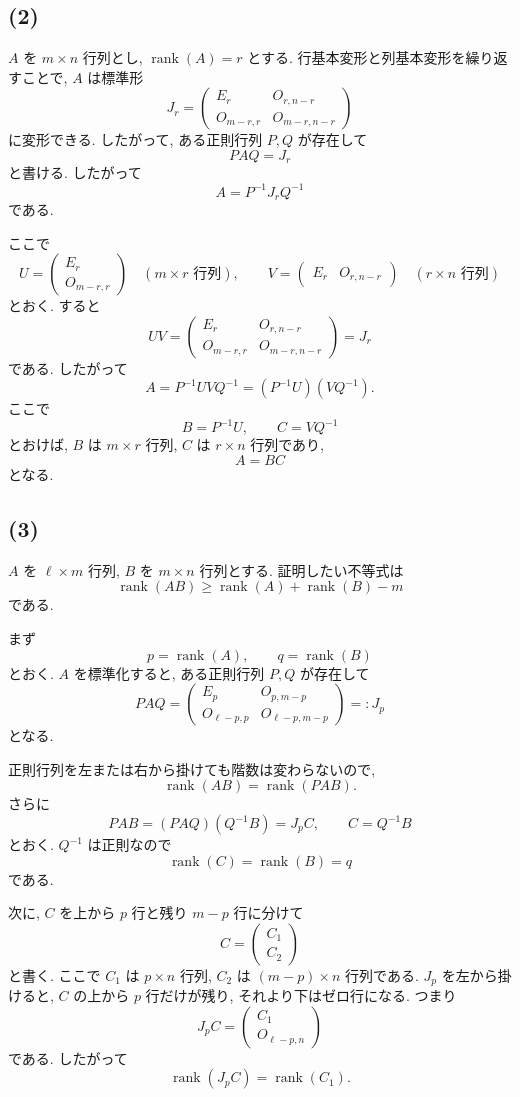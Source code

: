 \documentclass[uplatex,dvipdfmx,a4paper,14pt]{jsarticle}
\newcommand{\rank}{\operatorname{rank}}
\begin{document}
\subsection*{(2)}
$A$ を $m\times n$ 行列とし, $\rank(A)=r$ とする. 行基本変形と列基本変形を繰り返すことで, $A$ は標準形
\[
J_r=
\begin{pmatrix}
E_r&O_{r,n-r}\\
O_{m-r,r}&O_{m-r,n-r}
\end{pmatrix}
\]
に変形できる. したがって, ある正則行列 $P,Q$ が存在して
\[
PAQ=J_r
\]
と書ける. したがって
\[
A=P^{-1}J_rQ^{-1}
\]
である.

ここで
\[
U=
\begin{pmatrix}
E_r\\
O_{m-r,r}
\end{pmatrix}
\quad (m\times r\text{ 行列}),
\qquad
V=
\begin{pmatrix}
E_r&O_{r,n-r}
\end{pmatrix}
\quad (r\times n\text{ 行列})
\]
とおく. すると
\[
UV=
\begin{pmatrix}
E_r&O_{r,n-r}\\
O_{m-r,r}&O_{m-r,n-r}
\end{pmatrix}
=J_r
\]
である. したがって
\[
A=P^{-1}UVQ^{-1}=(P^{-1}U)(VQ^{-1}).
\]
ここで
\[
B=P^{-1}U,
\qquad
C=VQ^{-1}
\]
とおけば, $B$ は $m\times r$ 行列, $C$ は $r\times n$ 行列であり,
\[
\boxed{A=BC}
\]
となる.

\subsection*{(3)}
$A$ を $\ell\times m$ 行列, $B$ を $m\times n$ 行列とする. 証明したい不等式は
\[
\rank(AB)\ge \rank(A)+\rank(B)-m
\]
である.

まず
\[
p=\rank(A),\qquad q=\rank(B)
\]
とおく. $A$ を標準化すると, ある正則行列 $P,Q$ が存在して
\[
PAQ=
\begin{pmatrix}
E_p&O_{p,m-p}\\
O_{\ell-p,p}&O_{\ell-p,m-p}
\end{pmatrix}
=:J_p
\]
となる.

正則行列を左または右から掛けても階数は変わらないので,
\[
\rank(AB)=\rank(PAB).
\]
さらに
\[
PAB=(PAQ)(Q^{-1}B)=J_pC,
\qquad C=Q^{-1}B
\]
とおく. $Q^{-1}$ は正則なので
\[
\rank(C)=\rank(B)=q
\]
である.

次に, $C$ を上から $p$ 行と残り $m-p$ 行に分けて
\[
C=
\begin{pmatrix}
C_1\\C_2
\end{pmatrix}
\]
と書く. ここで $C_1$ は $p\times n$ 行列, $C_2$ は $(m-p)\times n$ 行列である. $J_p$ を左から掛けると, $C$ の上から $p$ 行だけが残り, それより下はゼロ行になる. つまり
\[
J_pC=
\begin{pmatrix}
C_1\\
O_{\ell-p,n}
\end{pmatrix}
\]
である. したがって
\[
\rank(J_pC)=\rank(C_1).
\]
\end{document}

